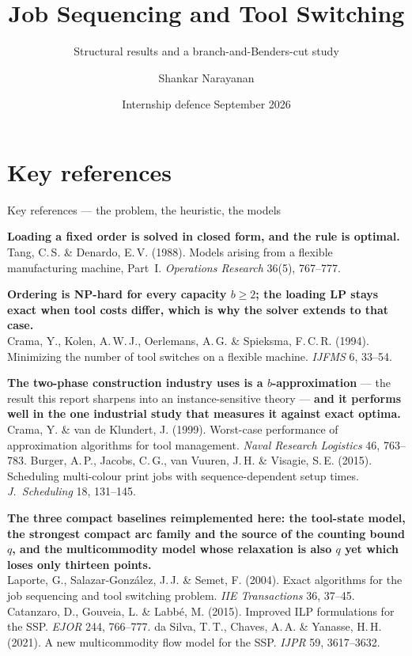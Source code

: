 \documentclass[aspectratio=169,10pt]{beamer}
\title[Job Sequencing and Tool Switching]{Job Sequencing and Tool Switching}
\subtitle{Structural results and a branch-and-Benders-cut study}
\author[Shankar Narayanan]{Shankar Narayanan}
\institute[LIMOS]{%
  \footnotesize Advisors: Prof.~Rafael Colares \quad Prof.~Annegret Wagler\\
  \footnotesize Academic supervisor: Dr.~Renaud Chicoisne\\[6pt]
  \footnotesize Laboratory of Informatics, Modelling and Optimisation of Systems (LIMOS)\\
  \footnotesize ISIMA, Clermont Auvergne INP}
\date[2 September 2026]{Internship defence \quad 2 September 2026}
\begin{document}


\appendix

\section*{Key references}

\begin{frame}{Key references --- the problem, the heuristic, the models}
\vspace{0.2cm}
{\scriptsize
\textbf{Loading a fixed order is solved in closed form, and the rule is optimal.}\\
Tang, C.\,S. \& Denardo, E.\,V. (1988). Models arising from a flexible manufacturing
machine, Part~I. \emph{Operations Research} 36(5), 767--777.

\vspace{0.26cm}
\textbf{Ordering is NP-hard for every capacity $b\ge2$; the loading LP stays exact when
tool costs differ, which is why the solver extends to that case.}\\
Crama, Y., Kolen, A.\,W.\,J., Oerlemans, A.\,G. \& Spieksma, F.\,C.\,R. (1994). Minimizing
the number of tool switches on a flexible machine. \emph{IJFMS} 6, 33--54.

\vspace{0.26cm}
\textbf{The two-phase construction industry uses is a $b$-approximation} --- the result
this report sharpens into an instance-sensitive theory --- \textbf{and it performs well in
the one industrial study that measures it against exact optima.}\\
Crama, Y. \& van de Klundert, J. (1999). Worst-case performance of approximation algorithms
for tool management. \emph{Naval Research Logistics} 46, 763--783. \quad
Burger, A.\,P., Jacobs, C.\,G., van Vuuren, J.\,H. \& Visagie, S.\,E. (2015). Scheduling
multi-colour print jobs with sequence-dependent setup times. \emph{J.\ Scheduling} 18, 131--145.

\vspace{0.26cm}
\textbf{The three compact baselines reimplemented here: the tool-state model, the strongest
compact arc family and the source of the counting bound $q$, and the multicommodity model
whose relaxation is also $q$ yet which loses only thirteen points.}\\
Laporte, G., Salazar-Gonz\'alez, J.\,J. \& Semet, F. (2004). Exact algorithms for the job
sequencing and tool switching problem. \emph{IIE Transactions} 36, 37--45. \quad
Catanzaro, D., Gouveia, L. \& Labb\'e, M. (2015). Improved ILP formulations for the SSP.
\emph{EJOR} 244, 766--777. \quad
da Silva, T.\,T., Chaves, A.\,A. \& Yanasse, H.\,H. (2021). A new multicommodity flow model
for the SSP. \emph{IJPR} 59, 3617--3632.
}
\end{frame}
\end{document}
